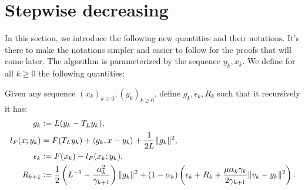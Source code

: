 \documentclass[12pt]{article}
\begin{document}
\section{Stepwise decreasing}
    In this section, we introduce the following new quantities and their notations. 
    It's there to make the notations simpler and easier to follow for the proofs that will come later. 
    The algorithm is parameterized by the sequence $y_k, x_k$. 
    We define for all $k \ge 0$ the following quantities: 
    \begin{assumption}
        Given any sequence $(x_k)_{k \ge 0}, (y_k)_{ k\ge 0}$, define $g_k, \epsilon_k, R_k$ such that it recursively it has: 
        \begin{align}
            g_k &\vcentcolon= L(y_k - T_L y_k), 
            \label{eqn:grad-map}
            \\
            l_F(x; y_k) &= F(T_Ly_k) + \langle g_k, x - y_k\rangle + \frac{1}{2L}\Vert g_k\Vert^2, 
            \label{eqn:lower-linearization}
            \\
            \epsilon_{k} &\vcentcolon= F(x_k) - l_F(x_k; y_k), 
            \label{eqn:regret}
            \\
            R_{k + 1}
            &\vcentcolon= 
            \frac{1}{2}\left(
                L^{-1} - \frac{\alpha_k^2}{\gamma_{k + 1}}
            \right)\Vert g_k\Vert^2
            + 
            (1 - \alpha_k)
            \left(
                \epsilon_k + R_k + 
                \frac{\mu\alpha_k\gamma_k}{2\gamma_{k + 1}}
                \Vert v_k - y_k\Vert^2
            \right). 
            \label{eqn:residual}
        \end{align}
    \end{assumption}
\end{document}
